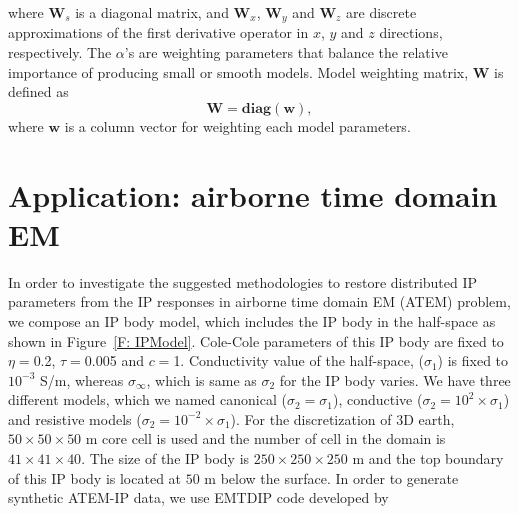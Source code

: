 \documentclass[a4paper, 11pt]{article}
\newcommand{\siginf}{\sigma_\infty}
\begin{document}
where $\mathbf{W}_s$ is a diagonal matrix, and $\mathbf{W}_x$, $\mathbf{W}_y$ and $\mathbf{W}_z$ are discrete approximations of the first derivative operator in $x$, $y$ and $z$ directions, respectively.  The $\alpha$'s are weighting parameters that balance the relative importance of producing small or smooth models. Model weighting matrix, $\mathbf{W}$ is defined as
\begin{equation}
    \mathbf{W} = \mathbf{diag}(\mathbf{w}),
    \label{eq: weight_mat}
\end{equation}
where $\mathbf{w}$ is a column vector for weighting each model parameters.


\section{Application: airborne time domain EM}
In order to investigate the suggested methodologies to restore distributed IP parameters from the IP responses in airborne time domain EM (ATEM) problem, we compose an IP body model, which includes the IP body in the half-space as shown in Figure~\ref{F: IPModel}. Cole-Cole parameters of this IP body are fixed to $\eta=$0.2, $\tau=$0.005 and $c=$1. Conductivity value of the half-space, ($\sigma_1$) is fixed to $10^{-3}$ S/m, whereas $\siginf$, which is same as $\sigma_2$ for the IP body varies. We have three different models, which we named canonical ($\sigma_2=\sigma_1$), conductive ($\sigma_2=10^2\times\sigma_1$) and resistive models ($\sigma_2=10^{-2}\times\sigma_1$).   For the discretization of 3D earth, $50\times50\times50$ m core cell is used and the number of cell in the domain is $41\times41\times40$. The size of the IP body is $250\times250\times250$ m and the top boundary of this IP body is located at $50$ m below the surface. In order to generate synthetic ATEM-IP data, we use EMTDIP code developed by \cite{Marchant2014}
\end{document}
